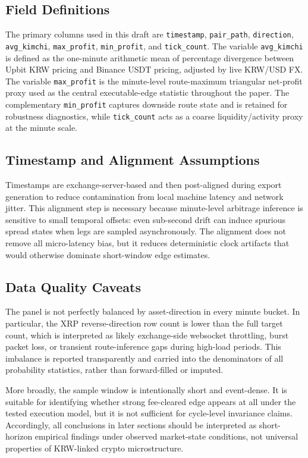 \documentclass[11pt,a4paper]{article}
\begin{document}
\subsection{Field Definitions}
The primary columns used in this draft are \texttt{timestamp}, \texttt{pair\_path}, \texttt{direction}, \texttt{avg\_kimchi}, \texttt{max\_profit}, \texttt{min\_profit}, and \texttt{tick\_count}. The variable \texttt{avg\_kimchi} is defined as the one-minute arithmetic mean of percentage divergence between Upbit KRW pricing and Binance USDT pricing, adjusted by live KRW/USD FX. The variable \texttt{max\_profit} is the minute-level route-maximum triangular net-profit proxy used as the central executable-edge statistic throughout the paper. The complementary \texttt{min\_profit} captures downside route state and is retained for robustness diagnostics, while \texttt{tick\_count} acts as a coarse liquidity/activity proxy at the minute scale.

\subsection{Timestamp and Alignment Assumptions}
Timestamps are exchange-server-based and then post-aligned during export generation to reduce contamination from local machine latency and network jitter. This alignment step is necessary because minute-level arbitrage inference is sensitive to small temporal offsets: even sub-second drift can induce spurious spread states when legs are sampled asynchronously. The alignment does not remove all micro-latency bias, but it reduces deterministic clock artifacts that would otherwise dominate short-window edge estimates.

\subsection{Data Quality Caveats}
The panel is not perfectly balanced by asset-direction in every minute bucket. In particular, the XRP reverse-direction row count is lower than the full target count, which is interpreted as likely exchange-side websocket throttling, burst packet loss, or transient route-inference gaps during high-load periods. This imbalance is reported transparently and carried into the denominators of all probability statistics, rather than forward-filled or imputed.

More broadly, the sample window is intentionally short and event-dense. It is suitable for identifying whether strong fee-cleared edge appears at all under the tested execution model, but it is not sufficient for cycle-level invariance claims. Accordingly, all conclusions in later sections should be interpreted as short-horizon empirical findings under observed market-state conditions, not universal properties of KRW-linked crypto microstructure.
\end{document}
